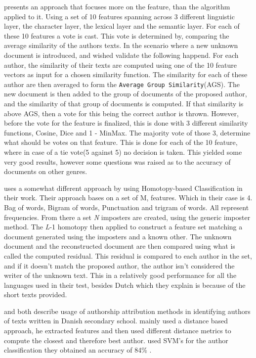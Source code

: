 \cite{castro2015} presents an approach that focuses more on the feature, than 
the algorithm applied to it. Using a set of 10 features spanning across 3 
different linguistic layer, the character layer, the lexical layer and the 
semantic layer. For each of these 10 features a vote is cast.
This vote is determined by, comparing the average similarity of the authors 
texts. In the scenario where a new unknown document is introduced, and wished 
validate the following happend.
For each author, the similarity of their texts are computed using one of the 10 
feature vectors as input for a chosen similarity function. The similarity for 
each of these author are then averaged to form the \texttt{Average Group 
Similarity}(AGS). The new document is then added to the group of documents of 
the proposed author, and the similarity of that group of documents is computed. 
If that similarity is above AGS, then a vote for this being the correct author 
is thrown.
However, before the vote for the feature is finalized, this is done with 3 
different similarity functions, Cosine, Dice and 1 - MinMax. The majority vote 
of those 3, determine what should be votes on that feature. This is done for 
each of the 10 feature, where in case of a tie vote(5 against 5) no decision is 
taken. This yielded some very good results, however some questions was raised 
as to the accuracy of documents on other genres.


\cite{gutierrez20150} uses a somewhat different approach by using Homotopy-based 
Classification in their work. Their approach bases on a set of M, features. 
Which in their case is 4. Bag of words, Bigram of words, Punctuation and 
trigram of words. All represent frequencies. From there a set \textit{N} 
imposters are created, using the generic imposter method. The \textit{L}-1 
homotopy then applied to construct a feature set matching a document generated 
using the imposters and a known other. The unknown document and the 
reconstructed document are then compared using what is called the computed 
residual. This residual is compared to each author in the set, and if it 
doesn't match the proposed author,  the author isn't considered the writer of 
the unknown text. This in a relatively good performance for all the languages 
used in their test, besides Dutch which they explain is because of the short 
texts provided. 

\cite{hansen2014} and \cite{aalykke2016} both describe usage of authorship
attribution methods in identifying authors of texts written in Danish secondary
school. \cite{aalykke2016} mainly used a distance based approach, he extracted
features and then used different distance metrics to compute the closest and
therefore best author. \cite{hansen2014} used SVM's for the author
classification they obtained an accuracy of 84\% .

